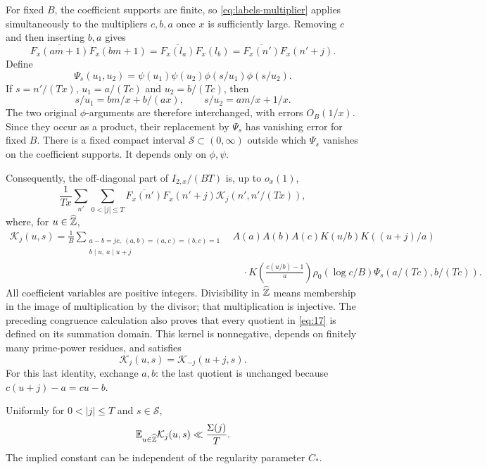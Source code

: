 For fixed $B$, the coefficient supports are finite, so
\eqref{eq:labels-multiplier} applies simultaneously to the multipliers
$c,b,a$ once $x$ is sufficiently large. Removing $c$ and then inserting
$b,a$ gives
\[
 \overline{F_x(am+1)}F_x(bm+1)
 =\overline{F_x(l_a)}F_x(l_b)
 =\overline{F_x(n')}F_x(n'+j).
\]
Define
\[
 \Psi_s(u_1,u_2)=
 \psi(u_1)\psi(u_2)\phi(s/u_1)\phi(s/u_2).
\]
If $s=n'/(Tx)$, $u_1=a/(Tc)$ and $u_2=b/(Tc)$, then
\[
 s/u_1=bm/x+b/(ax),\qquad s/u_2=am/x+1/x.
\]
The two original $\phi$-arguments are therefore interchanged, with
errors $O_B(1/x)$. Since they occur as a product, their replacement by
$\Psi_s$ has vanishing error for fixed $B$. There is a fixed compact
interval $\mathcal S\subset(0,\infty)$ outside which $\Psi_s$ vanishes
on the coefficient supports. It depends only on $\phi,\psi$.

Consequently, the off-diagonal part of $I_{2,x}/(BT)$ is, up to $o_x(1)$,
\begin{equation}\label{eq:16}
 \frac1{Tx}\sum_{n'}\sum_{0<|j|\le T}
 \overline{F_x(n')}F_x(n'+j)
       \mathcal K_j(n',n'/(Tx)),
\end{equation}
where, for $u\in\widehat{\mathbb Z}$,
\begin{equation}\label{eq:17}
\begin{split}
 \mathcal K_j(u,s)=\frac1B
 \sum_{\substack{a-b=jc,\ (a,b)=(a,c)=(b,c)=1\\
                  b\mid u,\ a\mid u+j}}
 &A(a)A(b)A(c)K(u/b)K((u+j)/a)\\[-2pt]
 &\quad\cdot K\!\left(\frac{c(u/b)-1}{a}\right)
 \rho_0(\log c/B)\Psi_s(a/(Tc),b/(Tc)).
\end{split}
\end{equation}
All coefficient variables are positive integers. Divisibility in
$\widehat{\mathbb Z}$ means membership in the image of multiplication by the
divisor; that multiplication is injective. The preceding congruence
calculation also proves that every quotient in \eqref{eq:17} is
defined on its summation domain. This kernel is nonnegative, depends
on finitely many prime-power residues, and satisfies
\[
 \mathcal K_j(u,s)=\mathcal K_{-j}(u+j,s).
\]
For this last identity, exchange $a,b$: the last quotient is unchanged
because $c(u+j)-a=cu-b$.

\begin{lemma}\label{lem:graph-edge-mass}
Uniformly for $0<|j|\le T$ and $s\in\mathcal S$,
\begin{equation}\label{eq:18}
 \mathbb E_{u\in\widehat{\mathbb Z}}\mathcal K_j(u,s)\ll\frac{\Sigma(j)}T.
\end{equation}
The implied constant can be independent of the regularity parameter
$C_*$.
\end{lemma}

